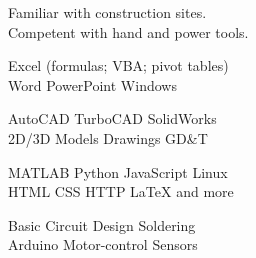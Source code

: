 Familiar with construction sites.\\
Competent with hand and power tools.\\
\sectionsep

Excel (formulas; VBA; pivot tables)\\
Word \textbullet{} PowerPoint \textbullet{} Windows \\
\sectionsep

AutoCAD  \textbullet{} TurboCAD \textbullet{} SolidWorks \\
2D/3D Models \textbullet{} Drawings \textbullet{} GD\&T \\
\sectionsep

MATLAB \textbullet{} Python \textbullet{} JavaScript \textbullet{} Linux \\
HTML \textbullet{} CSS \textbullet{} HTTP \textbullet{} \LaTeX \textbullet{} and more\\
\sectionsep

Basic Circuit Design \textbullet{} Soldering \\
Arduino \textbullet{} Motor-control \textbullet{} Sensors \\
\sectionsep
